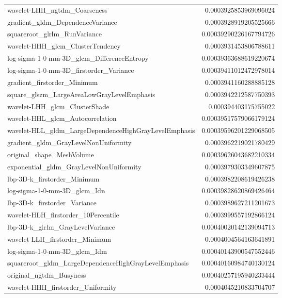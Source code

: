 {\begin{xltabular}[H]{\textwidth}{X r}
        wavelet-LHH\_ngtdm\_Coarseness & 0.0003925853969096024 \\
        gradient\_gldm\_DependenceVariance & 0.0003928919205525666 \\
        squareroot\_glrlm\_RunVariance & 0.00039290226167794726 \\
        wavelet-HHH\_glcm\_ClusterTendency & 0.0003931453806788611 \\
        log-sigma-1-0-mm-3D\_glcm\_DifferenceEntropy & 0.00039363688619220674 \\
        log-sigma-1-0-mm-3D\_firstorder\_Variance & 0.00039411012472978014 \\
        gradient\_firstorder\_Minimum & 0.0003941160288885128 \\
        square\_glszm\_LargeAreaLowGrayLevelEmphasis & 0.0003942212587750393 \\
        wavelet-LHH\_glcm\_ClusterShade & 0.000394403175755022 \\
        wavelet-HHL\_glcm\_Autocorrelation & 0.00039517579066179124 \\
        wavelet-HLL\_gldm\_LargeDependenceHighGrayLevelEmphasis & 0.00039596201229068505 \\
        gradient\_gldm\_GrayLevelNonUniformity & 0.0003962219021780429 \\
        original\_shape\_MeshVolume & 0.00039626043682210334 \\
        exponential\_gldm\_GrayLevelNonUniformity & 0.0003979303349607875 \\
        lbp-3D-k\_firstorder\_Minimum & 0.0003982208619426238 \\
        log-sigma-1-0-mm-3D\_glcm\_Idn & 0.00039828620869426464 \\
        lbp-3D-k\_firstorder\_Variance & 0.0003989627211201673 \\
        wavelet-HLH\_firstorder\_10Percentile & 0.0003999557192866124 \\
        lbp-3D-k\_glrlm\_GrayLevelVariance & 0.00040020142139094713 \\
        wavelet-LLH\_firstorder\_Minimum & 0.0004004564163641891 \\
        log-sigma-1-0-mm-3D\_glcm\_Idm & 0.00040143900547552446 \\
        squareroot\_gldm\_LargeDependenceHighGrayLevelEmphasis & 0.00040160984740130124 \\
        original\_ngtdm\_Busyness & 0.00040257195940233444 \\
        wavelet-HHH\_firstorder\_Uniformity & 0.0004045210833704707 \\

\end{xltabular}}
